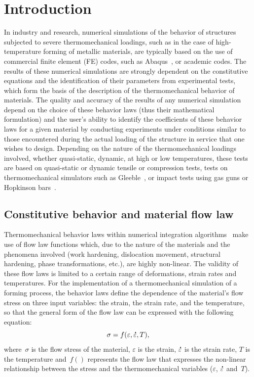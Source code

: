 \documentclass[algorithms,article,submit,pdftex,oneauthors]{Definitions/mdpi}
\DeclareRobustCommand{\mdot}[1]{\accentset{\mbox{\bfseries .}}{#1}}
\begin{document}
\section{Introduction}\label{sec:Introduction}

In industry and research, numerical simulations of the behavior of structures subjected to severe thermomechanical loadings, such as in the case of high-temperature forming of metallic materials, are typically based on the use of commercial finite element (FE) codes, such as Abaqus~\cite{Abaqus}, or academic codes.
The results of these numerical simulations are strongly dependent on the constitutive equations and the identification of their parameters from experimental tests, which form the basis of the description of the thermomechanical behavior of materials.
The quality and accuracy of the results of any numerical simulation depend on the choice of these behavior laws (thus their mathematical formulation) and the user's ability to identify the coefficients of these behavior laws for a given material by conducting experiments under conditions similar to those encountered during the actual loading of the structure in service that one wishes to design.
Depending on the nature of the thermomechanical loadings involved, whether quasi-static, dynamic, at high or low temperatures, these tests are based on quasi-static or dynamic tensile or compression tests, tests on thermomechanical simulators such as Gleeble~\cite{Lin-2009-MFS, Kumar-2016-TMS, Yu-2019-RCR}, or impact tests using gas guns or Hopkinson bars~\cite{Kolsky-1949-IMP}.

\subsection{Constitutive behavior and material flow law}\label{subsec:ConstBehavior}

Thermomechanical behavior laws within numerical integration algorithms~\cite{Ponthot-2002-USU} make use of flow law functions which, due to the nature of the materials and the phenomena involved (work hardening, dislocation movement, structural hardening, phase transformations, etc.), are highly non-linear.
The validity of these flow laws is limited to a certain range of deformations, strain rates and temperatures.
For the implementation of a thermomechanical simulation of a forming process, the behavior laws define the dependence of the material's flow stress on three input variables: the strain, the strain rate, and the temperature, so that the general form of the flow law can be expressed with the following equation:
\begin{equation}
\sigma = f\left(\varepsilon, \mdot{\varepsilon}, T\right),\label{eq:GenFlow}
\end{equation}
where~$\sigma$ is the flow stress of the material, $\varepsilon$ is the strain, $\mdot{\varepsilon}$ is the strain rate, $T$ is the temperature and~$f()$ represents the flow law that expresses the non-linear relationship between the stress and the thermomechanical variables ($\varepsilon$, $\mdot{\varepsilon}$ and~$T$).
\end{document}
